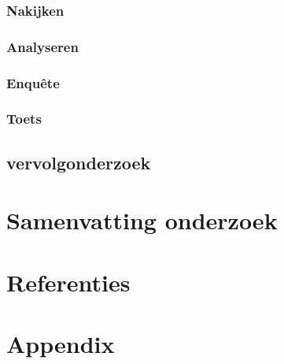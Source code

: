 \documentclass[12pt]{article}
\begin{document}
\subsubsection{Nakijken}


\subsubsection{Analyseren}


\subsubsection{Enquête}


\subsubsection{Toets}

\pagebreak
\subsection{vervolgonderzoek}

\section{Samenvatting onderzoek}

\section{Referenties}
\section{Appendix} %
\end{document}

